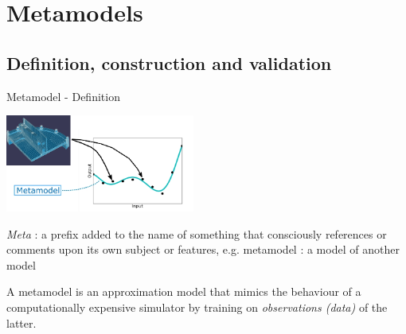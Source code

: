 \documentclass[9pt]{beamer}
\begin{document}
\section{Metamodels}

\subsection{Definition, construction and validation}

\begin{frame}[t]{Metamodel - Definition}

\begin{center}
 \includegraphics[height=3.2cm]{../Pics/resp_surf_sketch.jpg}
\end{center}


\emph{Meta} : a prefix added to the name of something that consciously references or comments upon its own subject or features, e.g. metamodel : a model of another model

\vspace{0.2cm}
A metamodel is an approximation model that mimics the behaviour of a computationally expensive simulator by training on \emph{observations (data)} of the latter.

 

\end{frame}
\end{document}
